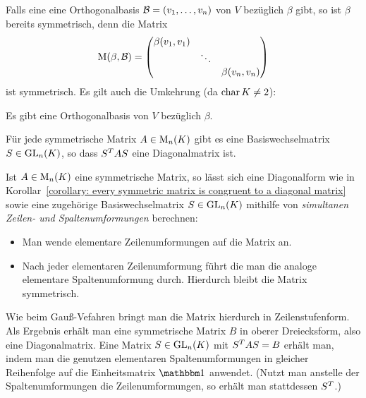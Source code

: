 Falls eine eine Orthogonalbasis $\mathcal{B} = (v_1, \dotsc, v_n)$ von $V$ bezüglich $\beta$ gibt, so ist $\beta$ bereits symmetrisch, denn die Matrix
\[
    \operatorname{M}(\beta, \mathcal{B})
  = \begin{pmatrix}
      \beta(v_1, v_1) &         &                 \\
                      & \ddots  &                 \\
                      &         & \beta(v_n, v_n)
    \end{pmatrix}
\]
ist symmetrisch.
Es gilt auch die Umkehrung (da $\operatorname{char} K \neq 2$):

\begin{theorem}
  \label{theorem: exstience of an orthogonal basis}
  Es gibt eine Orthogonalbasis von $V$ bezüglich $\beta$.
\end{theorem}

\begin{corollary}
  \label{corollary: every symmetric matrix is congruent to a diagonal matrix}
  Für jede symmetrische Matrix $A \in \operatorname{M}_{n}(K)$ gibt es eine Basiswechselmatrix $S \in \operatorname{GL}_{n}(K)$, so dass $S^T A S$ eine Diagonalmatrix ist.
\end{corollary}

Ist $A \in \operatorname{M}_{n}(K)$ eine symmetrische Matrix, so lässt sich eine Diagonalform wie in Korollar~\ref{corollary: every symmetric matrix is congruent to a diagonal matrix} sowie eine zugehörige Basiswechselmatrix $S \in \operatorname{GL}_{n}(K)$ mithilfe von \emph{simultanen Zeilen- und Spaltenumformungen} berechnen:
\begin{itemize}
  \item
    Man wende elementare Zeilenumformungen auf die Matrix an.
  \item
    Nach jeder elementaren Zeilenumformung führt die man die analoge elementare Spaltenumformung durch.
    Hierdurch bleibt die Matrix symmetrisch.
\end{itemize}
Wie beim Gauß-Vefahren bringt man die Matrix hierdurch in Zeilenstufenform.
Als Ergebnis erhält man eine symmetrische Matrix $B$ in oberer Dreiecksform, also eine Diagonalmatrix.
Eine Matrix $S \in \operatorname{GL}_{n}(K)$ mit $S^T A S = B$ erhält man, indem man die genutzen elementaren Spaltenumformungen in gleicher Reihenfolge auf die Einheitsmatrix $\Id$ anwendet.
(Nutzt man anstelle der Spaltenumformungen die Zeilenumformungen, so erhält man stattdessen $S^T$.)

